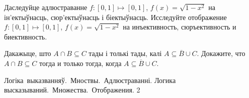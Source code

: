\begin{problemList}
\bigskip

\problemItemSimple
{Даследуйце адлюстраванне $f: [0, 1] \mapsto [0, 1]$, $f(x) = \sqrt{1 - x^2}$ на ін'ектыўнасць, сюр'ектыўнасць і біектыўнасць.}
{Исследуйте отображение $f: [0, 1] \mapsto [0, 1]$, $f(x) = \sqrt{1 - x^2}$ на инъективность, сюръективность и биективность.}

\bigskip

\problemItemSimple
{Дакажыце, што $A \cap B \subseteq C$ тады і толькі тады, калі $A \subseteq \overline{B} \cup C$.}
{Докажите, что $A \cap B \subseteq C$ тогда и только тогда, когда $A \subseteq \overline{B} \cup C$.}

\end{problemList}

\newpage

\quizTitle
{Логіка~выказванняў.~Мноствы.~Адлюстраванні.}
{Логика высказываний.~Множества.~Отображения.}
{2}

